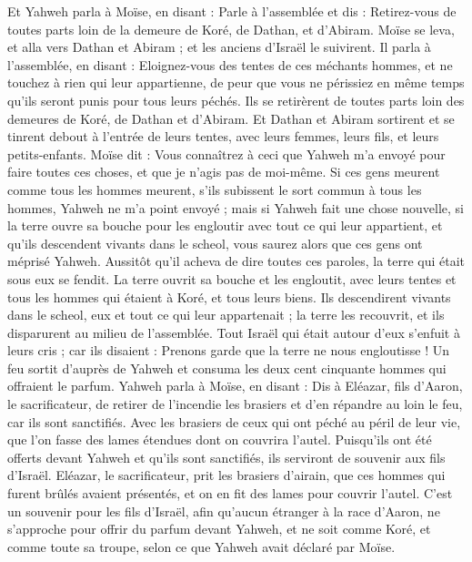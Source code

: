 \begin{multicols}{2}
Et Yahweh parla à Moïse, en disant :
Parle à l'assemblée et dis : Retirez-vous de toutes parts loin de la demeure de Koré, de Dathan, et d'Abiram.
Moïse se leva, et alla vers Dathan et Abiram ; et les anciens d'Israël le suivirent.
Il parla à l'assemblée, en disant : Eloignez-vous des tentes de ces méchants hommes, et ne touchez à rien qui leur appartienne, de peur que vous ne périssiez en même temps qu’ils seront punis pour tous leurs péchés.
Ils se retirèrent de toutes parts loin des demeures de Koré, de Dathan et d'Abiram. Et Dathan et Abiram sortirent et se tinrent debout à l'entrée de leurs tentes, avec leurs femmes, leurs fils, et leurs petits-enfants.
Moïse dit : Vous connaîtrez à ceci que Yahweh m'a envoyé pour faire toutes ces choses, et que je n’agis pas de moi-même.
Si ces gens meurent comme tous les hommes meurent, s'ils subissent le sort commun à tous les hommes, Yahweh ne m'a point envoyé ;
mais si Yahweh fait une chose nouvelle, si la terre ouvre sa bouche pour les engloutir avec tout ce qui leur appartient, et qu'ils descendent vivants dans le scheol, vous saurez alors que ces gens ont méprisé Yahweh.
Aussitôt qu'il acheva de dire toutes ces paroles, la terre qui était sous eux se fendit.
La terre ouvrit sa bouche et les engloutit, avec leurs tentes et tous les hommes qui étaient à Koré, et tous leurs biens.
Ils descendirent vivants dans le scheol, eux et tout ce qui leur appartenait ; la terre les recouvrit, et ils disparurent au milieu de l'assemblée.
Tout Israël qui était autour d'eux s'enfuit à leurs cris ; car ils disaient : Prenons garde que la terre ne nous engloutisse !
Un feu sortit d’auprès de Yahweh et consuma les deux cent cinquante hommes qui offraient le parfum.
Yahweh parla à Moïse, en disant :
Dis à Eléazar, fils d'Aaron, le sacrificateur, de retirer de l’incendie les brasiers et d’en répandre au loin le feu, car ils sont sanctifiés.
Avec les brasiers de ceux qui ont péché au péril de leur vie, que l'on fasse des lames étendues dont on couvrira l'autel. Puisqu'ils ont été offerts devant Yahweh et qu’ils sont sanctifiés, ils serviront de souvenir aux fils d'Israël.
Eléazar, le sacrificateur, prit les brasiers d'airain, que ces hommes qui furent brûlés avaient présentés, et on en fit des lames pour couvrir l'autel.
C'est un souvenir pour les fils d'Israël, afin qu'aucun étranger à la race d'Aaron, ne s'approche pour offrir du parfum devant Yahweh, et ne soit comme Koré, et comme toute sa troupe, selon ce que Yahweh avait déclaré par Moïse.

\end{multicols}
